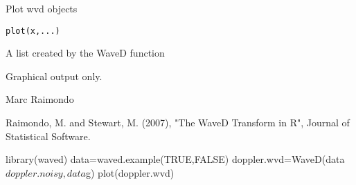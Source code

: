 \documentclass{article}
\begin{document}
\begin{Description}\relax
Plot  wvd objects
\end{Description}
\begin{Usage}
\begin{verbatim}
plot(x,...) 
\end{verbatim}
\end{Usage}
\begin{Arguments}
\begin{ldescription}
\item[\code{x}] A list created by the WaveD function 
\end{ldescription}
\end{Arguments}
\begin{Value}
Graphical output only.
\end{Value}
\begin{Author}\relax
Marc Raimondo
\end{Author}
\begin{References}\relax
Raimondo, M. and Stewart, M. (2007),
"The WaveD Transform in R", Journal of Statistical Software.
\end{References}
\begin{SeeAlso}\relax
{}
\end{SeeAlso}
\begin{Examples}
\begin{ExampleCode}
library(waved)
data=waved.example(TRUE,FALSE)
doppler.wvd=WaveD(data$doppler.noisy,data$g)
plot(doppler.wvd)

\end{ExampleCode}
\end{Examples}
\end{document}
